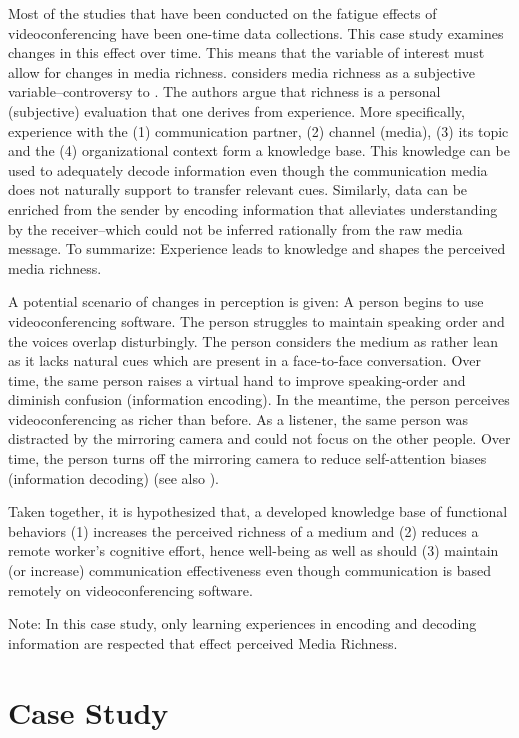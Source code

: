 \documentclass[man]{apa7}
\begin{document}
Most of the studies that have been conducted on the fatigue effects of videoconferencing have been one-time data collections. This case study examines changes in this effect over time. This means that the variable of interest must allow for changes in media richness. \cite{Carlson1999} considers media richness as a subjective variable–controversy to \citeauthor{daft1983information}. The authors argue that richness is a personal (subjective) evaluation that one derives from experience. More specifically, experience with the (1) communication partner, (2) channel (media), (3) its topic and the (4) organizational context form a knowledge base. This knowledge can be used to adequately decode information even though the communication media does not naturally support to transfer relevant cues. Similarly, data can be enriched from the sender by encoding information that alleviates understanding by the receiver–which could not be inferred rationally from the raw media message. To summarize: Experience leads to knowledge and shapes the perceived media richness.

A potential scenario of changes in perception is given: A person begins to use videoconferencing software. The person struggles to maintain speaking order and the voices overlap disturbingly. The person considers the medium as rather lean as it lacks natural cues which are present in a face-to-face conversation. Over time, the same person raises a virtual hand to improve speaking-order and diminish confusion (information encoding). In the meantime, the person perceives videoconferencing as richer than before. As a listener, the same person was distracted by the mirroring camera and could not focus on the other people. Over time, the person turns off the mirroring camera to reduce self-attention biases (information decoding) (see also \cite{Riedl2021}).

Taken together, it is hypothesized that, a developed knowledge base of functional behaviors (1) increases the perceived richness of a medium and (2) reduces a remote worker's cognitive effort, hence well-being as well as should (3) maintain (or increase) communication effectiveness even though communication is based remotely on videoconferencing software.

Note: In this case study, only learning experiences in encoding and decoding information are respected that effect perceived Media Richness.

\section{Case Study}
\end{document}
